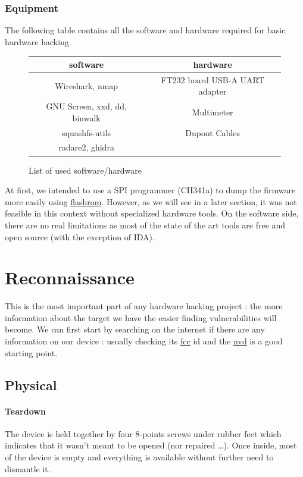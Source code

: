 \documentclass{article}
\begin{document}
\subsubsection{Equipment}
The following table contains all the software and hardware required for basic hardware hacking. 
\begin{figure}[!ht]
\begin{tabular}{|c|c|}
	\hline
	software & hardware \\
	\hline
	Wireshark, nmap & FT232 board USB-A UART adapter \\
	GNU Screen, xxd, dd, binwalk &  Multimeter \\
	squashfs-utils & Dupont Cables \\
	radare2, ghidra & \\
	\hline
\end{tabular}
\caption{List of used software/hardware}
\end{figure}


At first, we intended to use a SPI programmer (CH341a) to dump the firmware more easily using \href{https://github.com/flashrom/flashrom}{flashrom}. However, as we will see in a later section, it was not feasible in this context without specialized hardware tools. On the software side, there are no real limitations as most of the state of the art tools are free and open source (with the exception of IDA).
\section{Reconnaissance}
This is the most important part of any hardware hacking project : the more information about the target we have the easier finding vulnerabilities will become. We can first start by searching on the internet if there are any information on our device : usually checking its \href{https://fcc.report/FCC-ID/Q87-WAP4410N}{fcc} id and the \href{https://nvd.nist.gov/products/cpe/search/results?namingFormat=2.3&orderBy=2.3&keyword=cpe%3A2.3%3Ao%3Acisco%3Awap4410n_firmware&status=FINAL}{nvd} is a good starting point.

\subsection{Physical}
\paragraph{Teardown} The device is held together by four 8-points screws under rubber feet which indicates that it wasn't meant to be opened (nor repaired \dots). Once inside, most of the device is empty and everything is available without further need to dismantle it. 
\end{document}
